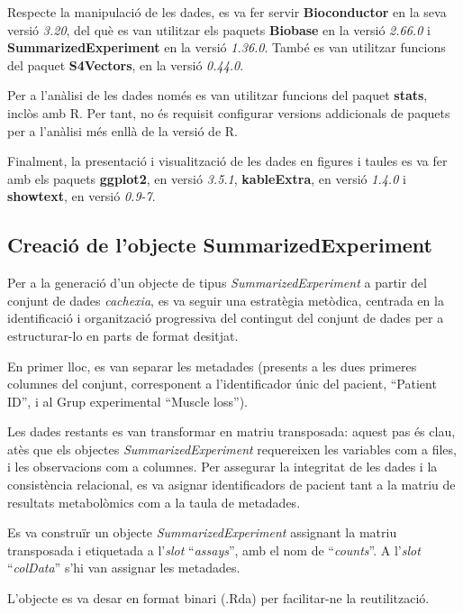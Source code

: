\documentclass[
  a4paper]{article}
\begin{document}
Respecte la manipulació de les dades, es va fer servir
\textbf{Bioconductor} en la seva versió \emph{3.20}, del què es van
utilitzar els paquets \textbf{Biobase} en la versió \emph{2.66.0} i
\textbf{SummarizedExperiment} en la versió \emph{1.36.0}. També es van
utilitzar funcions del paquet \textbf{S4Vectors}, en la versió
\emph{0.44.0}.

Per a l'anàlisi de les dades només es van utilitzar funcions del paquet
\textbf{stats}, inclòs amb R. Per tant, no és requisit configurar
versions addicionals de paquets per a l'anàlisi més enllà de la versió
de R.

Finalment, la presentació i visualització de les dades en figures i
taules es va fer amb els paquets \textbf{ggplot2}, en versió
\emph{3.5.1}, \textbf{kableExtra}, en versió \emph{1.4.0} i
\textbf{showtext}, en versió \emph{0.9-7}.

\subsection{Creació de l'objecte
SummarizedExperiment}\label{creaciuxf3-de-lobjecte-summarizedexperiment}

Per a la generació d'un objecte de tipus \emph{SummarizedExperiment} a
partir del conjunt de dades \emph{cachexia}, es va seguir una estratègia
metòdica, centrada en la identificació i organització progressiva del
contingut del conjunt de dades per a estructurar-lo en parts de format
desitjat.

En primer lloc, es van separar les metadades (presents a les dues
primeres columnes del conjunt, corresponent a l'identificador únic del
pacient, ``Patient ID'', i al Grup experimental ``Muscle loss'').

Les dades restants es van transformar en matriu transposada: aquest pas
és clau, atès que els objectes \emph{SummarizedExperiment} requereixen
les variables com a files, i les observacions com a columnes. Per
assegurar la integritat de les dades i la consistència relacional, es va
asignar identificadors de pacient tant a la matriu de resultats
metabolòmics com a la taula de metadades.

Es va construïr un objecte \emph{SummarizedExperiment} assignant la
matriu transposada i etiquetada a l'\emph{slot} ``\emph{assays}'', amb
el nom de ``\emph{counts}''. A l'\emph{slot} ``\emph{colData}'' s'hi van
assignar les metadades.

L'objecte es va desar en format binari (.Rda) per facilitar-ne la
reutilització.
\end{document}
